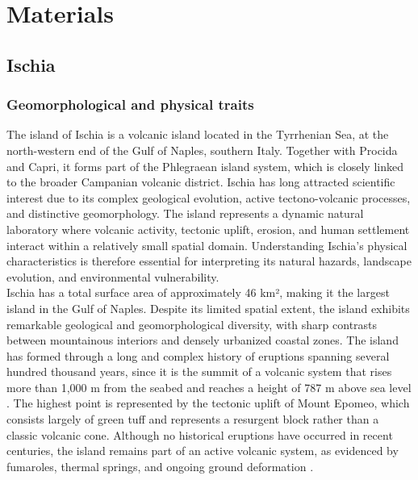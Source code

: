 \documentclass[10pt, twocolumn, twoside]{article}
\begin{document}
\section{Materials}\label{sec2}

\subsection{Ischia}\label{sec_I}
\subsubsection{Geomorphological and physical traits}
The island of Ischia is a volcanic island located in the Tyrrhenian Sea, at the north-western end of the Gulf of Naples, southern Italy. Together with Procida and Capri, it forms part of the Phlegraean island system, which is closely linked to the broader Campanian volcanic district. Ischia has long attracted scientific interest due to its complex geological evolution, active tectono-volcanic processes, and distinctive geomorphology. The island represents a dynamic natural laboratory where volcanic activity, tectonic uplift, erosion, and human settlement interact within a relatively small spatial domain. Understanding Ischia’s physical characteristics is therefore essential for interpreting its natural hazards, landscape evolution, and environmental vulnerability. \\
Ischia has a total surface area of approximately 46 km², making it the largest island in the Gulf of Naples. Despite its limited spatial extent, the island exhibits remarkable geological and geomorphological diversity, with sharp contrasts between mountainous interiors and densely urbanized coastal zones. The island has formed through a long and complex history of eruptions spanning several hundred thousand years, since it is the summit of a volcanic system that rises more than 1,000 m from the seabed and reaches a height of 787 m above sea level \cite{ingv}. The highest point is represented by the tectonic uplift of Mount Epomeo, which consists largely of green tuff and represents a resurgent block rather than a classic volcanic cone. Although no historical eruptions have occurred in recent centuries, the island remains part of an active volcanic system, as evidenced by fumaroles, thermal springs, and ongoing ground deformation \cite{ingv}. \\
\end{document}
